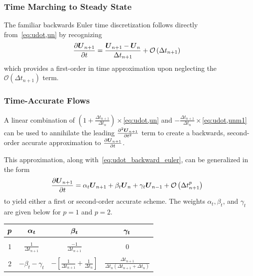 \documentclass[compress,11pt]{beamer}
\begin{document}
\subsubsection{Time Marching to Steady State}
\frame
{
  The familiar backwards Euler time discretization follows directly from~\eqref{eq:udot,un} by recognizing
\begin{equation}
  {\frac{\partial{{\boldsymbol{U}}_{n+1}}}{\partial{t}}} = \frac{{\boldsymbol{U}}_{n+1}-{\boldsymbol{U}}_n}{\Delta t_{n+1}} + \mathcal{O}\left(\Delta t_{n+1}\right)
  \label{eq:udot_backward_euler}
\end{equation}
which provides a first-order in time approximation upon neglecting the $\mathcal{O}\left(\Delta t_{n+1}\right)$ term.
}

\subsubsection{Time-Accurate Flows}
\frame
{
  \vspace{-.5em}
  \scriptsize
  A linear combination of $\left(1+\frac{\Delta t_{n+1}}{\Delta t_n}\right)\times$\eqref{eq:udot,un} and $-\frac{\Delta t_{n+1}}{\Delta t_n}\times$\eqref{eq:udot,unm1} can be used to annihilate the leading ${\frac{{\partial}^2{{\boldsymbol{U}}_{n+1}}}{\partial{t}^2}}$ term to create a backwards, second-order accurate approximation to ${\frac{\partial{{\boldsymbol{U}}_{n+1}}}{\partial{t}}}$.
  \vspace{.5em}
  
  This approximation, along with~\eqref{eq:udot_backward_euler}, can be generalized in the form
  \begin{equation}
    {\frac{\partial{{\boldsymbol{U}}_{n+1}}}{\partial{t}}} = \alpha_t {\boldsymbol{U}}_{n+1} + \beta_t {\boldsymbol{U}}_n + \gamma_t {\boldsymbol{U}}_{n-1} + \mathcal{O}\left(\Delta t_{n+1}^p\right)
    \label{eq:udot_thee_pt_backward}
  \end{equation}
  to yield either a first or second-order accurate scheme.  The weights $\alpha_t, \beta_t$, and $\gamma_t$ are given below for $p=1$ and $p=2$.

  \normalsize
  \begin{center}
    \begin{tabular}{c||ccc}
      ${\boldsymbol{p}}$ & ${\boldsymbol{\alpha_t}}$ & ${\boldsymbol{\beta_t}}$ & ${\boldsymbol{\gamma_t}}$ \\ \hline\hline
          &          &         & \\
       1  & $\frac{1}{\Delta t_{n+1}}$ & $\frac{-1}{\Delta t_{n+1}}$ & 0 \\
          &          &         & \\
       2  & $-\beta_t - \gamma_t$ %
          & $-\left[\frac{1}{\Delta t_{n+1}} + \frac{1}{\Delta t_n}\right]$
          & $\frac{\Delta t_{n+1}}{\Delta t_n\left(\Delta t_{n+1} + \Delta t_n\right)}$ 
    \end{tabular}
  \end{center}
}
\end{document}
